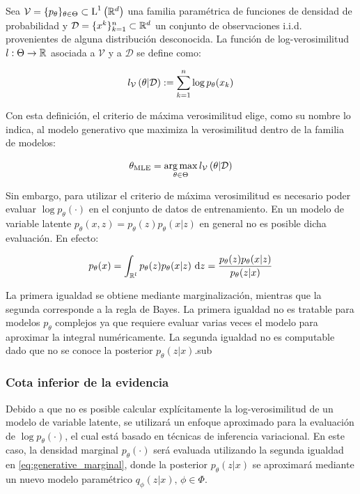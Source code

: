 \begin{defn}
    Sea $\mathcal{V}=\{p_\theta\}_{\theta\in\Theta}\subset\operatorname{L}^{1}\left(\mathbb{R}^d\right)$ una familia paramétrica de funciones de densidad de probabilidad y $\mathcal{D} = \{x^k\}_{k=1}^n\subset\mathbb{R}^d$ un conjunto de observaciones i.i.d. provenientes de alguna distribución desconocida. La función de log-verosimilitud $l:\Theta\to\mathbb{R}$ asociada a $\mathcal{V}$ y a $\mathcal{D}$ se define como:

    \begin{equation}
        l_\mathcal{V}\left(\theta|\mathcal{D}\right)
        := \sum_{k=1}^n \log p_\theta(x_k)
    \end{equation}
\end{defn}

Con esta definición, el criterio de máxima verosimilitud elige, como su nombre lo indica, al modelo generativo que maximiza la verosimilitud dentro de la familia de modelos:

\begin{equation*}
    \theta_{\text{MLE}}
    =\operatorname*{arg\,max}_{\theta\in\Theta} l_\mathcal{V}\left(\theta|\mathcal{D}\right)
\end{equation*}

Sin embargo, para utilizar el criterio de máxima verosimilitud es necesario poder evaluar $\log p_\theta(\cdot)$ en el conjunto de datos de entrenamiento. En un modelo de variable latente $p_\theta(x,z)=p_\theta(z)p_\theta(x|z)$ en general no es posible dicha evaluación. En efecto:

\begin{equation}
    \label{eq:generative_marginal}
    p_\theta(x)
    =\int_{\mathbb{R}^l} p_\theta(z)p_\theta(x|z) \,\operatorname{d}\! z
    = \frac{p_\theta(z)p_\theta(x|z)}{p_\theta(z|x)}
\end{equation}

La primera igualdad se obtiene mediante marginalización, mientras que la segunda corresponde a la regla de Bayes. La primera igualdad no es tratable para modelos $p_\theta$ complejos ya que requiere evaluar varias veces el modelo para aproximar la integral numéricamente. La segunda igualdad no es computable dado que no se conoce la posterior $p_\theta(z|x)$.sub

\subsubsection{Cota inferior de la evidencia}

Debido a que no es posible calcular explícitamente la log-verosimilitud de un modelo de variable latente, se utilizará un enfoque aproximado para la evaluación de $\log p_\theta(\cdot)$, el cual está basado en técnicas de inferencia variacional. En este caso, la densidad marginal $p_\theta(\cdot)$ será evaluada utilizando la segunda igualdad en \eqref{eq:generative_marginal}, donde la posterior $p_\theta(z|x)$ se aproximará mediante un nuevo modelo paramétrico $q_\phi(z|x),\,\phi\in\Phi$.

